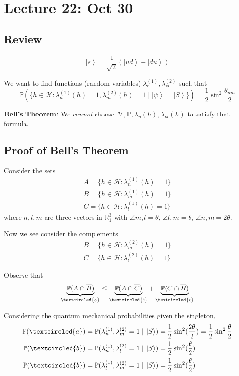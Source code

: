 \documentclass[12pt]{article}
\renewcommand{\P}{\mathbb{P}}
\newcommand{\R}{\mathbb{R}}
\newcommand{\ket}[1]{\left\vert #1 \right\rangle}
\begin{document}
\section*{Lecture 22: Oct 30}
    \subsection*{Review}
        \[\ket s = \frac{1}{\sqrt 2}(\ket{ud} - \ket{du})\]

        We want to find functions (random variables) $\lambda^{(1)}_n, \lambda_m^{(2)}$ such that 
        \[\P(\{h \in \mathcal{H}: \lambda_n^{(1)}(h) = 1, \lambda_m^{(2)}(h) = 1 \; | \; \ket{\psi} = \ket{S}\}) = \frac{1}{2}\sin^2 \frac{\theta_{nm}}{2}\] 

        \textbf{Bell's Theorem:} We \emph{cannot} choose $\mathcal{H}, \P, \lambda_n(h), \lambda_m(h)$ to satisfy that formula. 

    \subsection*{Proof of Bell's Theorem}
        Consider the sets 
        \begin{gather*}
            A = \{h \in \mathcal H : \lambda_n^{(1)}(h) = 1\}\\
            B = \{h \in \mathcal H : \lambda_m^{(1)}(h) = 1\}\\
            C = \{h \in \mathcal H : \lambda_l^{(1)}(h) = 1\}
        \end{gather*}
        where $n, l, m$ are three vectors in $\R_1^3$ with $\angle m, l = \theta$, $\angle l, m = \theta$, $\angle n, m = 2\theta$. 

        Now we see consider the complements:
        \begin{gather*}
            \overline B = \{h \in \mathcal H : \lambda_m^{(2)}(h) = 1\}\\
            \overline C = \{h \in \mathcal H : \lambda_l^{(2)}(h) = 1\}
        \end{gather*}

        Observe that 
        \[\underbrace{\P(A \cap \overline B)}_{\textcircled{a}} \leq \underbrace{\P(A \cap \overline C)}_{\textcircled{b}} + \underbrace{\P(C \cap \overline B)}_{\textcircled{c}}\]

        Considering the quantum mechanical probabilities given the singleton, 
        \begin{align*}
            \P(\textcircled{a}) &= \P(\lambda_n^{(1)}, \lambda_m^{(2)} = 1 \; | \; \ket S) = \frac{1}{2}\sin^2(\frac{2\theta}{2}) = \frac{1}{2}\sin^{2}\frac{\theta}{2}\\
            \P(\textcircled{b}) &= \P(\lambda_n^{(1)}, \lambda_l^{(2)} = 1 \; | \; \ket S) = \frac{1}{2}\sin^2(\frac{\theta}{2})\\
            \P(\textcircled{b}) &= \P(\lambda_l^{(1)}, \lambda_m^{(2)} = 1 \; | \; \ket S) = \frac{1}{2}\sin^2(\frac{\theta}{2})
        \end{align*}
\end{document}

